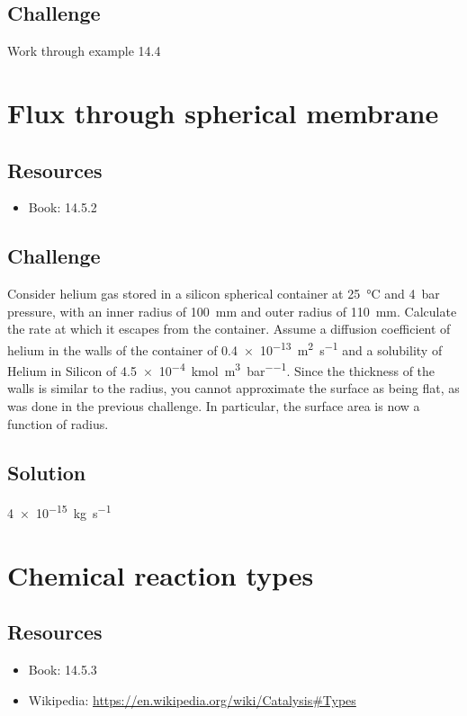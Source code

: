 \subsection*{Challenge}
Work through example 14.4




\newpage
\section{Flux through spherical membrane}

\subsection*{Resources}
\begin{itemize}
    \item Book: 14.5.2
\end{itemize}

\subsection*{Challenge}
Consider helium gas stored in a silicon spherical container at \SI{25}{\celsius} and \SI{4}{\bar} pressure, with an inner radius of \SI{100}{\mm} and outer radius of \SI{110}{\mm}. Calculate the rate at which it escapes from the container. Assume a diffusion coefficient of helium in the walls of the container of \SI{0.4e-13}{\square\meter\per\second} and a solubility of Helium in Silicon of \SI{4.5e-4}{\kmol\per\cubic\meter\per\bar}. Since the thickness of the walls is similar to the radius, you cannot approximate the surface as being flat, as was done in the previous challenge. In particular, the surface area is now a function of radius.

\subsection*{Solution}
\SI{4e-15}{\kg\per\second}




\newpage
\section{Chemical reaction types}

\subsection*{Resources}
\begin{itemize}
    \item Book: 14.5.3
    \item Wikipedia: \url{https://en.wikipedia.org/wiki/Catalysis#Types}
\end{itemize}

